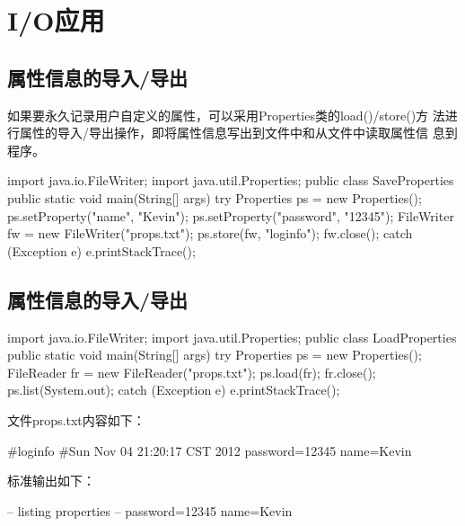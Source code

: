 \section{I/O应用}

\subsection{属性信息的导入/导出}

如果要永久记录用户自定义的属性，可以采用Properties类的load()/store()方
法进行属性的导入/导出操作，即将属性信息写出到文件中和从文件中读取属性信
息到程序。


\begin{javaCode}
  import java.io.FileWriter;
  import java.util.Properties;
  public class SaveProperties {
    public static void main(String[] args) {
      try {
        Properties ps = new Properties();
        ps.setProperty("name", "Kevin");
        ps.setProperty("password", "12345");
        FileWriter fw = new FileWriter("props.txt");
        ps.store(fw, "loginfo");
        fw.close();
      } catch (Exception e) {
        e.printStackTrace();
      }
    }
  }
\end{javaCode}

\subsection{属性信息的导入/导出}


\begin{javaCode}
  import java.io.FileWriter;
  import java.util.Properties;
  public class LoadProperties {
    public static void main(String[] args) {
      try {
        Properties ps = new Properties();
        FileReader fr = new FileReader("props.txt");
        ps.load(fr);
        fr.close();
        ps.list(System.out);
      } catch (Exception e) {
        e.printStackTrace();
      }
    }
  }
\end{javaCode}

文件props.txt内容如下：

\begin{shCode}
#loginfo
#Sun Nov 04 21:20:17 CST 2012
password=12345
name=Kevin
\end{shCode}

标准输出如下：

\begin{stdoutCode}
-- listing properties --
password=12345
name=Kevin
\end{stdoutCode}

